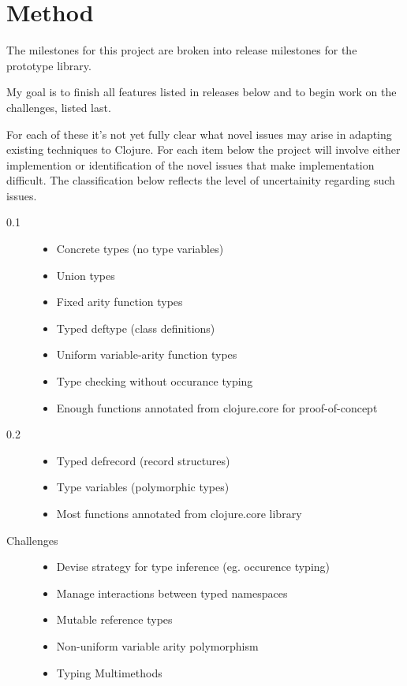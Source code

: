 \documentclass[12pt, a4paper]{article}
\begin{document}
\section*{Method}


The milestones for this project are broken into release milestones
for the prototype library.

My goal is to finish all features listed in releases below
and to begin work on the challenges, listed last.

For each of these it's not yet fully clear what novel issues may 
arise in adapting existing techniques to Clojure.  For each item 
below the project will involve either implemention or identification 
of the novel issues that make implementation difficult.  
The classification below reflects the level of uncertainity 
regarding such issues.

\begin{description}
\item[0.1]
	\begin{itemize}
	\item Concrete types (no type variables)
	\item Union types
	\item Fixed arity function types
	\item Typed deftype (class definitions)
	\item Uniform variable-arity function types
	\item Type checking without occurance typing
	\item Enough functions annotated from clojure.core for proof-of-concept
	\end{itemize}
\item[0.2]
	\begin{itemize}
	\item Typed defrecord (record structures)
	\item Type variables (polymorphic types)
	\item Most functions annotated from clojure.core library
	\end{itemize}
\item[Challenges]
	\begin{itemize}
	\item Devise strategy for type inference (eg. occurence typing)
	\item Manage interactions between typed namespaces
	\item Mutable reference types
	\item Non-uniform variable arity polymorphism
	\item Typing Multimethods
	\end{itemize}

\end{description}
\end{document}
